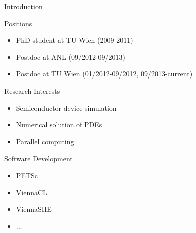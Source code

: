 

\begin{frame}{Introduction}

 \begin{block}{Positions}
   \begin{itemize}
    \item PhD student at TU Wien (2009-2011)
    \item Postdoc at ANL (09/2012-09/2013)
    \item Postdoc at TU Wien (01/2012-09/2012, 09/2013-current)
   \end{itemize}
 \end{block}

 \begin{block}{Research Interests}
   \begin{itemize}
    \item Semiconductor device simulation
    \item Numerical solution of PDEs
    \item Parallel computing
   \end{itemize}
 \end{block}

 \begin{block}{Software Development}
   \begin{itemize}
    \item PETSc
    \item ViennaCL
    \item ViennaSHE
    \item ...
   \end{itemize}
 \end{block}

\end{frame}



